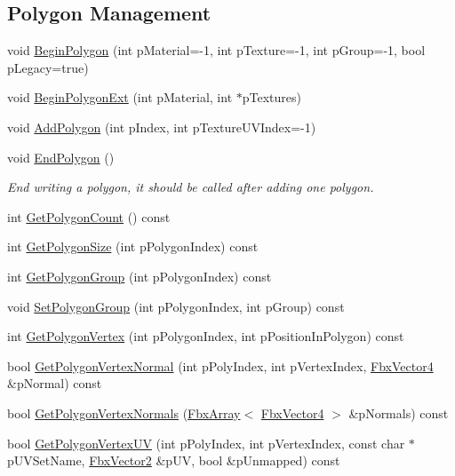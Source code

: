 \subsection*{Polygon Management}
\begin{DoxyCompactItemize}
\item 
void \hyperlink{class_fbx_mesh_aebaf7be01966e5a365a0bc49b8d15b3b}{Begin\+Polygon} (int p\+Material=-\/1, int p\+Texture=-\/1, int p\+Group=-\/1, bool p\+Legacy=true)
\item 
void \hyperlink{class_fbx_mesh_a0c81b70dd5b832d34841b7a5111be8b9}{Begin\+Polygon\+Ext} (int p\+Material, int $\ast$p\+Textures)
\item 
void \hyperlink{class_fbx_mesh_ab483f915e44a3a3613da51bcbe1a2ad6}{Add\+Polygon} (int p\+Index, int p\+Texture\+U\+V\+Index=-\/1)
\item 
void \hyperlink{class_fbx_mesh_a50b65ca7dca5c691bc50db6f55e0d0c9}{End\+Polygon} ()
\begin{DoxyCompactList}\small\item\em End writing a polygon, it should be called after adding one polygon. \end{DoxyCompactList}\item 
int \hyperlink{class_fbx_mesh_a0f443f6d64284e6b60bdd52fb1f53ea7}{Get\+Polygon\+Count} () const
\item 
int \hyperlink{class_fbx_mesh_a775d0e10dc67bbcb9f7368d828588e55}{Get\+Polygon\+Size} (int p\+Polygon\+Index) const
\item 
int \hyperlink{class_fbx_mesh_aca17b9c024aa056115bdb173daf25e8c}{Get\+Polygon\+Group} (int p\+Polygon\+Index) const
\item 
void \hyperlink{class_fbx_mesh_ab7c7d2325c2afa2c7bd0099b9a0f24dc}{Set\+Polygon\+Group} (int p\+Polygon\+Index, int p\+Group) const
\item 
int \hyperlink{class_fbx_mesh_ad1875b3c43e44bf960e371cd668734b3}{Get\+Polygon\+Vertex} (int p\+Polygon\+Index, int p\+Position\+In\+Polygon) const
\item 
bool \hyperlink{class_fbx_mesh_a0a761b70353b1ac6ed016fba192ee667}{Get\+Polygon\+Vertex\+Normal} (int p\+Poly\+Index, int p\+Vertex\+Index, \hyperlink{class_fbx_vector4}{Fbx\+Vector4} \&p\+Normal) const
\item 
bool \hyperlink{class_fbx_mesh_a84574b6ee629f27da2ca2be6c6f42e80}{Get\+Polygon\+Vertex\+Normals} (\hyperlink{class_fbx_array}{Fbx\+Array}$<$ \hyperlink{class_fbx_vector4}{Fbx\+Vector4} $>$ \&p\+Normals) const
\item 
bool \hyperlink{class_fbx_mesh_ab620226c1d138f01121c7bdc16945d92}{Get\+Polygon\+Vertex\+UV} (int p\+Poly\+Index, int p\+Vertex\+Index, const char $\ast$p\+U\+V\+Set\+Name, \hyperlink{class_fbx_vector2}{Fbx\+Vector2} \&p\+UV, bool \&p\+Unmapped) const

\end{DoxyCompactItemize}
